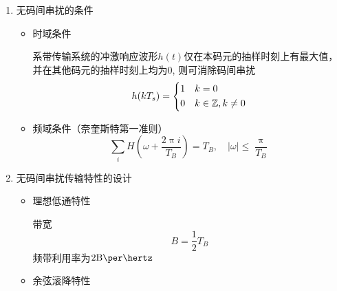 \documentclass[UTF8]{ctexrep}
\newcommand{\Z}{\mathbb{Z}}
\def\pth#1{\left( {#1}\right)}
\def\Baud{{\mathrm{B}}}
\begin{document}
\begin{enumerate}
\item 无码间串扰的条件
\begin{itemize}
\item 时域条件\par
系带传输系统的冲激响应波形$h(t)$仅在本码元的抽样时刻上有最大值，并在其他码元的抽样时刻上均为$0$, 则可消除码间串扰
\[h(kT_s)=\begin{dcases}1&k=0\\0&k\in\Z, k\neq 0\end{dcases}\]
\item 频域条件（奈奎斯特第一准则）
\[\sum_iH\pth{\omega +\frac{2\uppi i}{T_B}}=T_B,\quad |\omega|\leq \frac{\uppi}{T_B}\]
\end{itemize}
\item 无码间串扰传输特性的设计
\begin{itemize}
\item 理想低通特性\par
带宽
\[B=\frac{1}{2}T_B\]
频带利用率为$2\Baud\per\hertz$
\item 余弦滚降特性
\end{itemize}
\end{enumerate}
\end{document}
